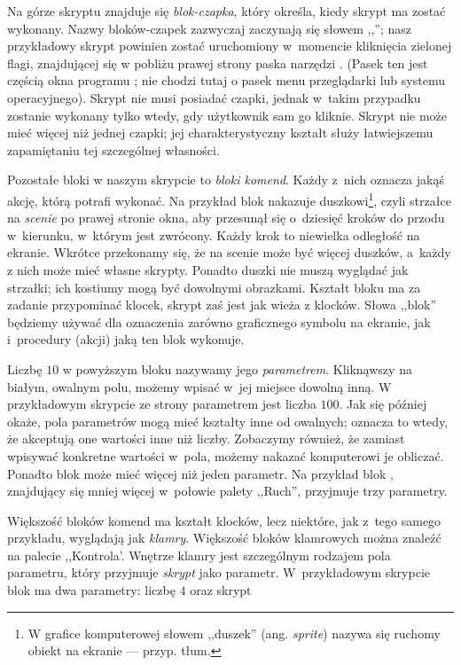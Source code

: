 \documentclass[a4paper]{report}
\begin{document}
Na górze skryptu znajduje się \emph{blok-czapka}, który określa, kiedy skrypt ma zostać wykonany. Nazwy bloków-czapek zazwyczaj zaczynają się słowem ,,''; nasz przykładowy skrypt powinien zostać uruchomiony w~momencie kliknięcia zielonej flagi, znajdującej się w pobliżu prawej strony paska narzędzi . (Pasek ten jest częścią okna programu \Snap{}; nie chodzi tutaj o pasek menu przeglądarki lub systemu operacyjnego). Skrypt nie musi posiadać czapki, jednak w~takim przypadku zostanie wykonany tylko wtedy, gdy użytkownik sam go kliknie. Skrypt nie może mieć więcej niż jednej czapki; jej charakterystyczny kształt służy łatwiejszemu zapamiętaniu tej szczególnej własności.

Pozostałe bloki w naszym skrypcie to \emph{bloki komend}. Każdy z~nich oznacza jakąś akcję, którą \Snap{} potrafi wykonać. Na przykład blok  nakazuje duszkowi\footnote{W grafice komputerowej słowem ,,duszek'' (ang. \textit{sprite}) nazywa się ruchomy obiekt na ekranie --- przyp. tłum.}, czyli strzałce na \emph{scenie} po prawej stronie okna, aby przesunął się o~dziesięć kroków do przodu w~kierunku, w~którym jest zwrócony. Każdy krok to niewielka odległość na ekranie. Wkrótce przekonamy się, że na scenie może być więcej duszków, a~każdy z nich może mieć własne skrypty. Ponadto duszki nie muszą wyglądać jak strzałki; ich kostiumy mogą być dowolnymi obrazkami. Kształt bloku  ma za zadanie przypominać klocek, skrypt zaś jest jak wieża z klocków. Słowa ,,blok'' będziemy używać dla oznaczenia zarówno graficznego symbolu na ekranie, jak i~procedury (akcji) jaką ten blok wykonuje.

Liczbę $10$ w powyższym bloku  nazywamy jego \emph{parametrem}. Kliknąwszy na białym, owalnym polu, możemy wpisać w~jej miejsce dowolną inną. W przykładowym skrypcie ze strony \pageref{fig:typowy-skrypt} parametrem jest liczba $100$. Jak się później okaże, pola parametrów mogą mieć kształty inne od owalnych; oznacza to wtedy, że akceptują one wartości inne niż liczby. Zobaczymy również, że zamiast wpisywać konkretne wartości w~pola, możemy nakazać komputerowi je obliczać. Ponadto blok może mieć więcej niż jeden parametr. Na przykład blok , znajdujący się mniej więcej w~połowie palety ,,Ruch'', przyjmuje trzy parametry.

Większość bloków komend ma kształt klocków, lecz niektóre, jak  z~tego samego przykładu, wyglądają jak \emph{klamry}. Większość bloków klamrowych można znaleźć na palecie ,,Kontrola'. Wnętrze klamry jest szczególnym rodzajem pola parametru, który przyjmuje \emph{skrypt} jako parametr. W~przykładowym skrypcie blok  ma dwa parametry: liczbę $4$ oraz skrypt\nopagebreak
\end{document}
